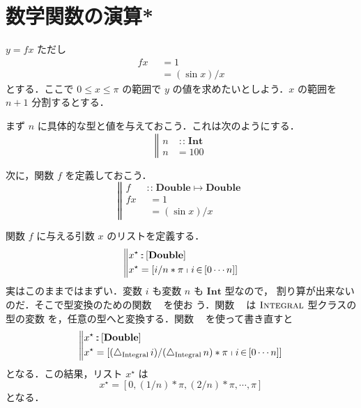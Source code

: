 \documentclass[a5paper,twoside,fleqn]{jsbook}
\newcommand{\mBrace}{\Vert}
\newcommand{\mKeyword}[1]{\mathsf{#1}} %
\newcommand{\mOtherwiseKeyword}{\mKeyword{otherwise}}
\DeclareMathOperator{\mOtherwise}{\mOtherwiseKeyword}
\newcommand{\mUpCast}{\bigtriangleup}
\DeclareMathOperator{\mFromIntegral}{\mUpCast_\text{Integral}}
\DeclareMathOperator{\mFrom}{\in}
\DeclareMathOperator{\mIn}{{:\!:}}
\DeclareMathOperator{\mMapsTo}{\mapsto}
\newcommand{\mType}[1]{\mathbf{#1}}
\newcommand{\mDoubleType}{\mType{Double}}
\newcommand{\mIntType}{\mType{Int}}
\newcommand{\mListType}[1]{[\mType{#1}]}
\newcommand{\mListWith}[1]{\left[#1\right]}
\newcommand{\mGenericTypeClass}[1]{\textsc{#1}} %
\newcommand{\mIntegralTypeClass}{\mGenericTypeClass{Integral}}
\newcommand{\mList}[1]{{#1}^\mathrm{\star}}
\newcommand{\mGuard}[1]{\mathop{\mid_{#1}}}
\newcommand{\mListComp}[1]{\shortmid#1}
\newcommand{\mProj}[2]{#1\mMapsTo#2}
\begin{document}
\section{数学関数の演算*}

$y=fx$ ただし
\begin{equation}
\begin{aligned}
fx&\mGuard{x\equiv0}=1\\
&\mGuard{\mOtherwise}=(\sin x)/x
\end{aligned}
\end{equation}
とする．ここで $0\le x\le\pi$ の範囲で $y$ の値を求めたいとしよう．$x$
の範囲を $n+1$ 分割するとする．

まず $n$ に具体的な型と値を与えておこう．これは次のようにする．
\begin{equation}
\left\mBrace
\begin{aligned}
n&\mIn\mIntType\\
n&=100
\end{aligned}
\right.
\end{equation}

次に，関数 $f$ を定義しておこう．
\begin{equation}
\left\mBrace
\begin{aligned}
f&\mIn\mProj{\mDoubleType}{\mDoubleType}\\
fx&\mGuard{x\equiv0}=1\\
&\mGuard{\mOtherwise}=(\sin x)/x
\end{aligned}
\right.
\end{equation}

関数 $f$ に与える引数 $x$ のリストを定義する．
\begin{equation*}
\left\mBrace
\begin{aligned}
\mList{x}&\mIn{}\mListType{\mDoubleType}\\
\mList{x}&=\mListWith{i/n*\pi\mListComp{i\mFrom\mListWith{0\dotsb n}}}
\end{aligned}
\right.
\end{equation*}
実はこのままではまずい．変数 $i$ も変数 $n$ も $\mIntType$ 型なので，
割り算が出来ないのだ．そこで型変換のための関数 $\mFromIntegral$ を使お
う．関数 $\mFromIntegral$ は $\mIntegralTypeClass$ 型クラスの型の変数
を，任意の型へと変換する．関数 $\mFromIntegral$ を使って書き直すと
\begin{equation}
\left\mBrace
\begin{aligned}
\mList{x}&\mIn{}\mListType{\mDoubleType}\\
\mList{x}&=\mListWith{(\mFromIntegral i)/(\mFromIntegral n)*\pi\mListComp{i\mFrom\mListWith{0\dotsb n}}}
\end{aligned}
\right.
\end{equation}
となる．この結果，リスト $\mList{x}$ は
\begin{equation}
\mList{x}=\mListWith{0,(1/n)*\pi,(2/n)*\pi,\dotsb,\pi}
\end{equation}
となる．
\end{document}
